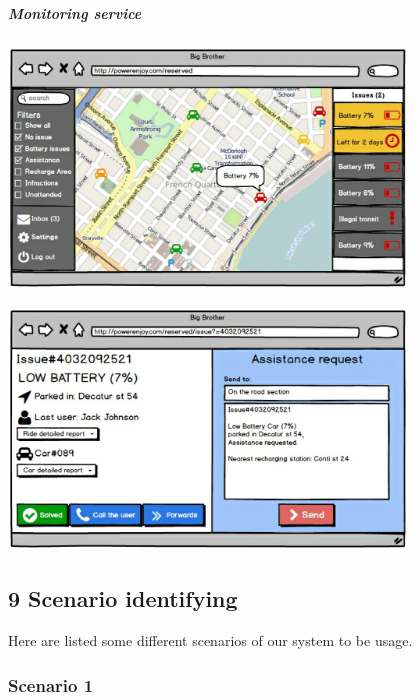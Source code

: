 \documentclass[]{article}
\let\oldsubparagraph\subparagraph
\renewcommand{\subparagraph}[1]{\oldsubparagraph{#1}\mbox{}}
\begin{document}
\subparagraph{\texorpdfstring{Monitoring service
\newline \newline}{Monitoring service }}\label{monitoring-service}

\centerline{\includegraphics[width=4.16667in]{./Monitoringservice/Monitoringservice-1.png}}

\centerline{\includegraphics[width=4.16667in]{./Monitoringservice/Monitoringservice-2.png}}\newpage

\subsection{9 Scenario identifying}\label{scenario-identifying}

Here are listed some different scenarios of our system to be usage.

\subsubsection{Scenario 1}\label{scenario-1}
\end{document}
